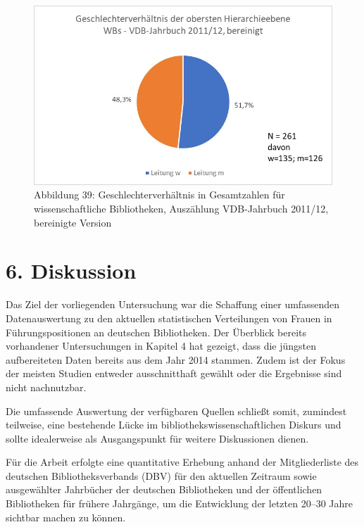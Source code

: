 \documentclass[a4paper,
fontsize=11pt,
oneside,
numbers=noperiodatend,
parskip=half-,
bibliography=totoc,
final
]{scrartcl}
\begin{document}
\begin{figure}
\centering
\includegraphics{img/Abb_39_VDB-2011_gesamt_bereinigt.jpg}
\caption{Abbildung 39: Geschlechterverhältnis in Gesamtzahlen für
wissenschaftliche Bibliotheken, Auszählung VDB-Jahrbuch 2011/12,
bereinigte Version}
\end{figure}

\hypertarget{diskussion}{%
\section{6. Diskussion}\label{diskussion}}

Das Ziel der vorliegenden Untersuchung war die Schaffung einer
umfassenden Datenauswertung zu den aktuellen statistischen Verteilungen
von Frauen in Führungspositionen an deutschen Bibliotheken. Der
Überblick bereits vorhandener Untersuchungen in Kapitel 4 hat gezeigt,
dass die jüngsten aufbereiteten Daten bereits aus dem Jahr 2014 stammen.
Zudem ist der Fokus der meisten Studien entweder ausschnitthaft gewählt
oder die Ergebnisse sind nicht nachnutzbar.

Die umfassende Auswertung der verfügbaren Quellen schließt somit,
zumindest teilweise, eine bestehende Lücke im
bibliothekswissenschaftlichen Diskurs und sollte idealerweise als
Ausgangspunkt für weitere Diskussionen dienen.

Für die Arbeit erfolgte eine quantitative Erhebung anhand der
Mitgliederliste des deutschen Bibliotheksverbands (DBV) für den
aktuellen Zeitraum sowie ausgewählter Jahrbücher der deutschen
Bibliotheken und der öffentlichen Bibliotheken für frühere Jahrgänge, um
die Entwicklung der letzten 20--30 Jahre sichtbar machen zu können.
\end{document}
